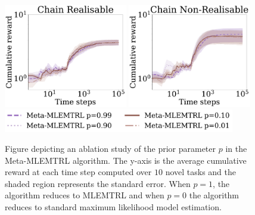 \begin{figure}[h]
    
    \centering
    \includegraphics[width=0.48\textwidth]{img/chain_meta_realisable.pdf} 
    \includegraphics[width=0.48\textwidth]{img/chain_meta_non_realisable.pdf}\\
    \includegraphics[width=0.9\textwidth]{img/lqr_legend3.pdf}
    \caption{Figure depicting an ablation study of the prior parameter $p$ in the Meta-MLEMTRL algorithm. The y-axis is the average cumulative reward at each time step computed over $10$ novel tasks and the shaded region represents the standard error. When $p=1$, the algorithm reduces to MLEMTRL and when $p=0$ the algorithm reduces to standard maximum likelihood model estimation.}
    \label{fig:meta_results}
\end{figure}



